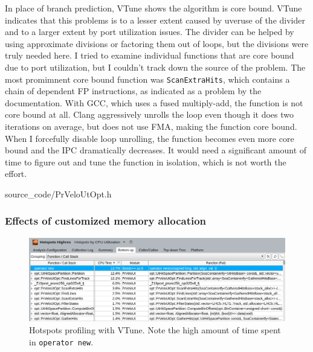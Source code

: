\documentclass[12pt]{article}
\newcommand{\code}[1]{\texttt{#1}}
\begin{document}
In place of branch prediction, VTune shows the algorithm is core bound. VTune indicates that this problems is to a lesser extent caused by uveruse of the divider and to a larger extent by port utilization issues. The divider can be helped by using approximate divisions or factoring them out of loops, but the divisions were truly needed here. I tried to examine individual functions that are core bound due to port utilization, but I couldn't track down the source of the problem. The most promimnent core bound function was \code{ScanExtraHits}, which contains a chain of dependent FP instructions, as indicated as a problem by the documentation\cite{intel_vtune_docs}. With GCC, which uses a fused multiply-add, the function is not core bound at all. Clang aggressively unrolls the loop even though it does two iterations on average, but does not use FMA, making the function core bound. When I forcefully disable loop unrolling, the function becomes even more core bound and the IPC dramatically decreases. It would need a significant amount of time to figure out and tune the function in isolation, which is not worth the effort.


	{source_code/PrVeloUtOpt.h}



\subsubsection{Effects of customized memory allocation}


\begin{figure}[H]
	\begin{center}
		\includegraphics[width=\textwidth]{velout_without_alloc}
	\end{center}
	\caption{Hotspots profiling with VTune. Note the high amount of time spent in \code{operator new}.}
	\label{fig_velout_without_alloc}
\end{figure}
\end{document}
